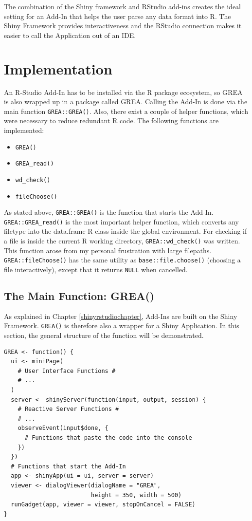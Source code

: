 \documentclass[12pt]{article} %
\newcommand{\li}{\lstinline}
\begin{document}
The combination of the Shiny framework and RStudio add-ins creates the ideal setting for an Add-In that helps the user parse any data format into R. The Shiny Framework provides interactiveness and the RStudio connection makes it easier to call the Application out of an IDE.

\section{Implementation}

An R-Studio Add-In has to be installed via the R package ecosystem, so GREA is also wrapped up in a package called GREA. Calling the Add-In is done via the main function \li{GREA::GREA()}. Also, there exist a couple of helper functions, which were necessary to reduce redundant R code.
The following functions are implemented:

\begin{itemize}
\item \li{GREA()}
\item \li{GREA_read()}
\item \li{wd_check()}
\item \li{fileChoose()}
\end{itemize}

As stated above, \li{GREA::GREA()} is the function that starts the Add-In. \li{GREA::GREA_read()} is the most important helper function, which converts any filetype into the data.frame R class inside the global environment. For checking if a file is inside the current R working directory, \li{GREA::wd_check()} was written. This function arose from my personal frustration with large filepaths. \li{GREA::fileChoose()} has the same utility as \li{base::file.choose()} (choosing a file interactively), except that it returns \li{NULL} when cancelled.

\subsection{The Main Function: \textrm{GREA()}}
\label{mainfunctionchapter}
As explained in Chapter \ref{shinyrstudiochapter}, Add-Ins are built on the Shiny Framework. \li{GREA()} is therefore also a wrapper for a Shiny Application. In this section, the general structure of the function will be demonstrated.

\begin{lstlisting}[caption = Structure of the \li{GREA()} function, label = greacode]
GREA <- function() {
  ui <- miniPage(
    # User Interface Functions #
    # ...
  )
  server <- shinyServer(function(input, output, session) {
    # Reactive Server Functions #
    # ...
    observeEvent(input$done, {
      # Functions that paste the code into the console
    })
  })
  # Functions that start the Add-In
  app <- shinyApp(ui = ui, server = server)
  viewer <- dialogViewer(dialogName = "GREA", 
                         height = 350, width = 500)
  runGadget(app, viewer = viewer, stopOnCancel = FALSE)
}
\end{lstlisting}
\end{document}
